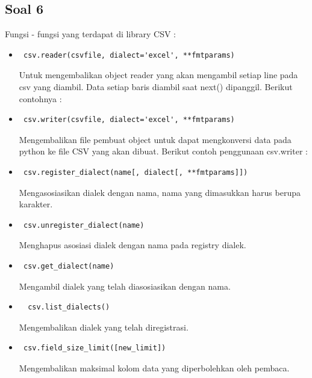 \subsection{Soal 6}
Fungsi - fungsi yang terdapat di library CSV : 
\begin{itemize}
	\item \begin{verbatim} csv.reader(csvfile, dialect='excel', **fmtparams) \end{verbatim} Untuk mengembalikan	object reader yang akan mengambil setiap line pada csv yang diambil. Data setiap baris diambil saat next() dipanggil. Berikut contohnya : 
	\item \begin{verbatim} csv.writer(csvfile, dialect='excel', **fmtparams) \end{verbatim} Mengembalikan file pembuat object untuk dapat mengkonversi data pada python ke file CSV yang akan dibuat. Berikut contoh penggunaan csv.writer : 
	\item \begin{verbatim} csv.register_dialect(name[, dialect[, **fmtparams]]) \end{verbatim} Mengasosiasikan dialek dengan nama, nama yang dimasukkan harus berupa karakter.
	\item \begin{verbatim} csv.unregister_dialect(name) \end{verbatim}
	Menghapus asosiasi dialek dengan nama pada registry dialek.
	\item \begin{verbatim} csv.get_dialect(name) \end{verbatim}
	Mengambil dialek yang telah diasosiasikan dengan nama. 
	\item \begin{verbatim}  csv.list_dialects() \end{verbatim} Mengembalikan dialek yang telah diregistrasi.
	\item \begin{verbatim} csv.field_size_limit([new_limit]) \end{verbatim} Mengembalikan maksimal kolom data yang diperbolehkan oleh pembaca.
\end{itemize}
